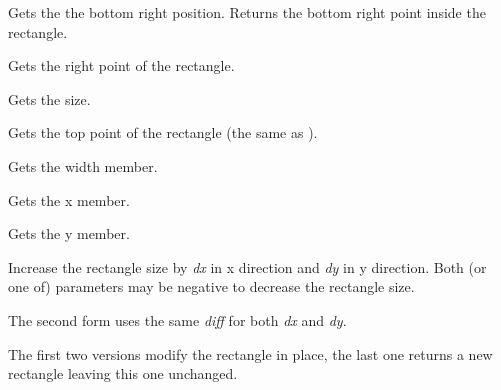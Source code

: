 
Gets the the bottom right position. Returns the bottom right point inside the rectangle.

\label{wxrectgetright}


Gets the right point of the rectangle.

\label{wxrectgetsize}


Gets the size.

\label{wxrectgettop}


Gets the top point of the rectangle (the same as ).

\label{wxrectgetwidth}


Gets the width member.

\label{wxrectgetx}


Gets the x member.

\label{wxrectgety}


Gets the y member.

\label{wxrectinflate}




Increase the rectangle size by {\it dx} in x direction and {\it dy} in y
direction. Both (or one of) parameters may be negative to decrease the
rectangle size.

The second form uses the same {\it diff} for both {\it dx} and {\it dy}.

The first two versions modify the rectangle in place, the last one returns a
new rectangle leaving this one unchanged.



